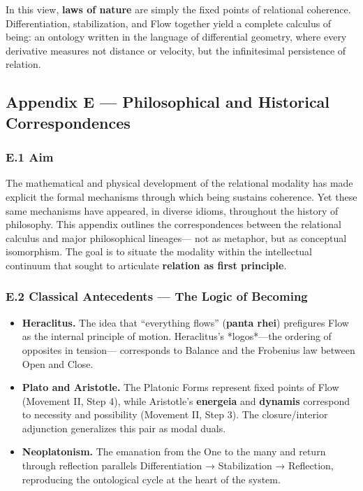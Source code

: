 \documentclass[11pt]{article}
\begin{document}
In this view, \textbf{laws of nature} are simply the fixed points of relational coherence.  
Differentiation, stabilization, and Flow together yield  
a complete calculus of being:  
an ontology written in the language of differential geometry,  
where every derivative measures not distance or velocity,  
but the infinitesimal persistence of relation.
\subsection*{Appendix E — Philosophical and Historical Correspondences}
\label{sec:org61c1a51}

\subsubsection*{E.1 Aim}
\label{sec:orgc587b80}
The mathematical and physical development of the relational modality  
has made explicit the formal mechanisms through which being sustains coherence.  
Yet these same mechanisms have appeared, in diverse idioms,  
throughout the history of philosophy.  
This appendix outlines the correspondences between  
the relational calculus and major philosophical lineages—  
not as metaphor, but as conceptual isomorphism.  
The goal is to situate the modality within the intellectual continuum  
that sought to articulate \textbf{relation as first principle}.
\subsubsection*{E.2 Classical Antecedents — The Logic of Becoming}
\label{sec:org1f8fc49}
\begin{itemize}
\item \textbf{\textbf{Heraclitus.}}  
The idea that “everything flows” (\textbf{panta rhei})  
prefigures Flow as the internal principle of motion.  
Heraclitus’s *logos*—the ordering of opposites in tension—  
corresponds to Balance and the Frobenius law between Open and Close.

\item \textbf{\textbf{Plato and Aristotle.}}  
The Platonic Forms represent fixed points of Flow (Movement II, Step 4),  
while Aristotle’s \textbf{energeia} and \textbf{dynamis} correspond to  
necessity and possibility (Movement II, Step 3).  
The closure/interior adjunction generalizes this pair as modal duals.

\item \textbf{\textbf{Neoplatonism.}}  
The emanation from the One to the many and return through reflection  
parallels Differentiation → Stabilization → Reflection,  
reproducing the ontological cycle at the heart of the system.
\end{itemize}
\end{document}
